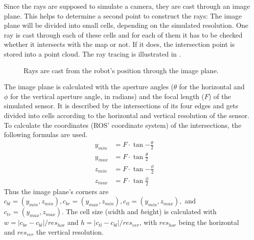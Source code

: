 \documentclass[Thesis.tex]{subfiles}
\begin{document}
Since the rays are supposed to simulate a camera, they are cast through an image plane. This helps to determine a second point to construct the rays: The image plane will be divided into small cells, depending on the simulated resolution. One ray is cast through each of these cells and for each of them it has to be checked whether it intersects with the map or not. If it does, the intersection point is stored into a point cloud. The ray tracing is illustrated in .
%
\begin{figure}[!htp]
  \caption{Rays are cast from the robot's position through the image plane.}
  \label{fig:raytrace_scheme}
\end{figure}
%
The image plane is calculated with the aperture angles ($\theta$ for the horizontal and $\phi$ for the vertical aperture angle, in radians) and the focal length ($F$) of the simulated sensor. It is described by the intersections of its four edges and gets divided into cells according to the horizontal and vertical resolution of the sensor. To calculate the coordinates (\gls{ROS}' coordinate system) of the intersections, the following formulas are used.
%
\begin{align}
y_{min} &= F \cdot \tan{-\frac{\theta}{2}} &\label{form:image_plane} \\
y_{max} &= F \cdot \tan{ \frac{\theta}{2}} &\\
z_{min} &= F \cdot \tan{-\frac{\phi}{2}} &\\
z_{max} &= F \cdot \tan{ \frac{\phi}{2}} &
\end{align}
%
Thus the image plane's corners are $c_{bl}=(y_{min}, z_{min}), c_{br}=(y_{max}, z_{min}), c_{tl}=(y_{min}, z_{max}),$ and $c_{tr}=(y_{max}, z_{max})$. The cell size ($w$idth and $h$eight) is calculated with $w=|c_{br}-c_{bl}|/res_{hor}$ and $h=|c_{tl}-c_{bl}|/res_{ver}$, with $res_{hor}$ being the horizontal and $res_{ver}$ the vertical resolution.
\end{document}
